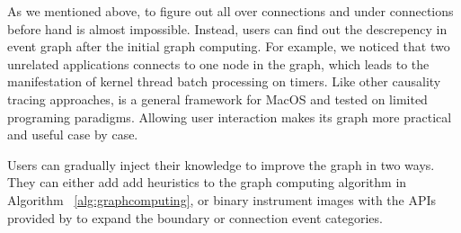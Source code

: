 As we mentioned above, to figure out all over connections and under connections
before hand is almost impossible. Instead, users can find out the descrepency
in event graph after the initial graph computing. For example, we noticed that
two unrelated applications connects to one node in the graph, which leads to the
manifestation of kernel thread batch processing on timers. Like other causality
tracing approaches, \xxx is a general framework for MacOS and tested on limited
programing paradigms. Allowing user interaction makes its graph more practical
and useful case by case.

Users can gradually inject their knowledge to improve the graph in two ways.
They can either add add heuristics to the graph computing algorithm in Algorithm
~\ref{alg:graphcomputing}, or binary instrument images with the APIs provided by
\xxx to expand the boundary or connection event categories.
